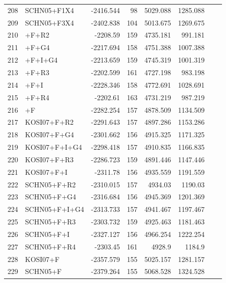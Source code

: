 \documentclass[12pt]{article}
\begin{document}
\begin{longtable}{clrrrrrr}
	208 & SCHN05+F1X4 & -2416.544 & 98 & 5029.088 & 1285.088 \\ 
	209 & SCHN05+F3X4 & -2402.838 & 104 & 5013.675 & 1269.675 \\ 
	210 & \gy+F+R2 & -2208.59 & 159 & 4735.181 & 991.181 \\ 
	211 & \gy+F+G4 & -2217.694 & 158 & 4751.388 & 1007.388 \\ 
	212 & \gy+F+I+G4 & -2213.659 & 159 & 4745.319 & 1001.319 \\ 
	213 & \gy+F+R3 & -2202.599 & 161 & 4727.198 & 983.198 \\ 
	214 & \gy+F+I & -2228.346 & 158 & 4772.691 & 1028.691 \\ 
	215 & \gy+F+R4 & -2202.61 & 163 & 4731.219 & 987.219 \\ 
	216 & \gy+F & -2282.254 & 157 & 4878.509 & 1134.509 \\ 
	217 & KOSI07+F+R2 & -2291.643 & 157 & 4897.286 & 1153.286 \\ 
	218 & KOSI07+F+G4 & -2301.662 & 156 & 4915.325 & 1171.325 \\ 
	219 & KOSI07+F+I+G4 & -2298.418 & 157 & 4910.835 & 1166.835 \\ 
	220 & KOSI07+F+R3 & -2286.723 & 159 & 4891.446 & 1147.446 \\ 
	221 & KOSI07+F+I & -2311.78 & 156 & 4935.559 & 1191.559 \\ 
	222 & SCHN05+F+R2 & -2310.015 & 157 & 4934.03 & 1190.03 \\ 
	223 & SCHN05+F+G4 & -2316.684 & 156 & 4945.369 & 1201.369 \\ 
	224 & SCHN05+F+I+G4 & -2313.733 & 157 & 4941.467 & 1197.467 \\ 
	225 & SCHN05+F+R3 & -2303.732 & 159 & 4925.463 & 1181.463 \\ 
	226 & SCHN05+F+I & -2327.127 & 156 & 4966.254 & 1222.254 \\ 
	227 & SCHN05+F+R4 & -2303.45 & 161 & 4928.9 & 1184.9 \\ 
	228 & KOSI07+F & -2357.579 & 155 & 5025.157 & 1281.157 \\ 
	229 & SCHN05+F & -2379.264 & 155 & 5068.528 & 1324.528  \\
\end{longtable}

\clearpage
\end{document}
